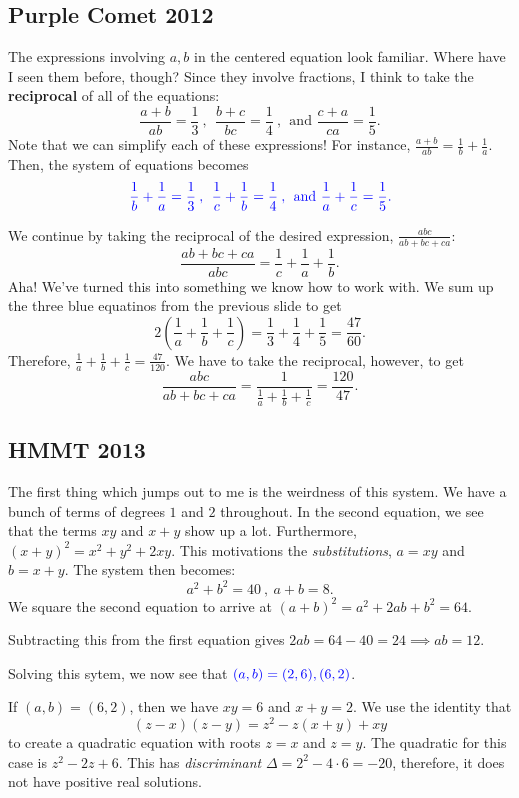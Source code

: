 \subsection{Purple Comet 2012}
The expressions involving $a,b$ in the centered equation look familiar. Where have I seen them before, though? Since they involve fractions, I think to take the \textbf{reciprocal} of all of the equations: $$\frac{a+b}{ab}=\frac13\:,\:\: \frac{b+c}{bc}=\frac14\:,\:\: \text{and } \frac{c+a}{ca}=\frac15.$$ 
Note that we can simplify each of these expressions! For instance, $\frac{a+b}{ab}=\frac{1}{b}+\frac{1}{a}$. Then, the system of equations becomes $$\color{blue}\frac{1}{b}+\frac{1}{a}=\frac13\:,\:\: \frac{1}{c}+\frac{1}{b}=\frac14\:,\:\: \text{and } \frac{1}{a}+\frac{1}{c}=\frac15.$$ 
\clearpage

We continue by taking the reciprocal of the desired expression, $\frac{abc}{ab+bc+ca}$: $$\frac{ab+bc+ca}{abc}=\frac{1}{c}+\frac{1}{a}+\frac{1}{b}.$$ Aha! We've turned this into something we know how to work with. We sum up the three blue equatinos from the previous slide to get $$2\left(\frac1a+\frac1b+\frac1c\right)=\frac13+\frac14+\frac15=\frac{47}{60}.$$ Therefore, $\displaystyle \frac1a+\frac1b+\frac1c=\frac{47}{120}$. We have to take the reciprocal, however, to get $$\frac{abc}{ab+bc+ca}=\frac{1}{\frac1a+\frac1b+\frac1c}=\boxed{\frac{120}{47}}.$$

\clearpage

\subsection{HMMT 2013}
The first thing which jumps out to me is the weirdness of this system. We have a bunch of terms of degrees $1$ and $2$ throughout. In the second equation, we see that the terms $xy$ and $x+y$ show up a lot. Furthermore, $(x+y)^2=x^2+y^2+2xy$. This motivations the \textit{substitutions}, $a=xy$ and $b=x+y$. The system then becomes: $$a^2+b^2=40\:,\: a+b=8.$$  
We square the second equation to arrive at $(a+b)^2=a^2+2ab+b^2=64$. 

Subtracting this from the first equation gives $2ab=64-40=24\implies ab=12.$

Solving this sytem, we now see that $\color{blue} (a,b)=(2,6), (6,2)$.
\clearpage

If $(a,b)=(6,2)$, then we have $xy=6$ and $x+y=2$. We use the identity that $$(z-x)(z-y)=z^2-z(x+y)+xy$$ to create a quadratic equation with roots $z=x$ and $z=y$. The quadratic for this case is $z^2-2z+6$. This has \textit{discriminant} $\Delta=2^2-4\cdot 6=-20$, therefore, it does not have positive real solutions.

